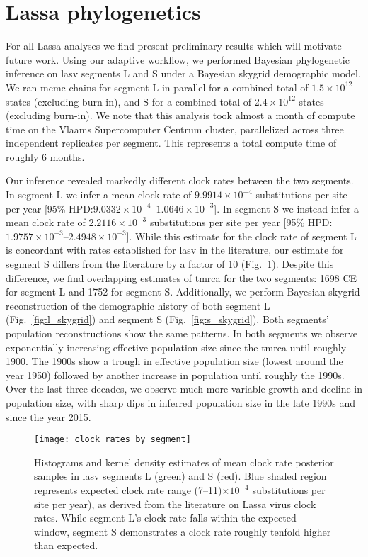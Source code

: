 \section{Lassa phylogenetics}

For all Lassa analyses we find present preliminary results which will motivate future work.
Using our adaptive workflow, we performed Bayesian phylogenetic inference on \gls{lasv} segments L and S under a Bayesian skygrid demographic model.
We ran \gls{mcmc} chains for segment L in parallel for a combined total of $1.5\times10^{12}$ states (excluding burn-in), and S for a combined total of $2.4\times10^{12}$ states (excluding burn-in).
We note that this analysis took almost a month of compute time on the Vlaams Supercomputer Centrum cluster, parallelized across three independent replicates per segment.
This represents a total compute time of roughly 6 months.

Our inference revealed markedly different clock rates between the two segments.
In segment L we infer a mean clock rate of $9.9914\times10^{-4}$ substitutions per site per year [95\% HPD:$9.0332\times10^{-4}$--$1.0646\times10^{-3}$].
In segment S we instead infer a mean clock rate of $2.2116\times10^{-3}$ substitutions per site per year [95\% HPD:$1.9757\times10^{-3}$--$2.4948\times10^{-3}$].
While this estimate for the clock rate of segment L is concordant with rates established for \gls{lasv} in the literature\cite{andersen2015clinical, fichet2016spatial}, our estimate for segment S differs from the literature by a factor of 10 (Fig.~\ref{fig:lassa_clock_rates}).
Despite this difference, we find overlapping estimates of \gls{tmrca} for the two segments: 1698 CE for segment L and 1752 for segment S.
Additionally, we perform Bayesian skygrid reconstruction of the demographic history of both segment L (Fig.~\ref{fig:l_skygrid}) and segment S (Fig.~\ref{fig:s_skygrid}).
Both segments' population reconstructions show the same patterns.
In both segments we observe exponentially increasing effective population size since the \gls{tmrca} until roughly 1900.
The 1900s show a trough in effective population size (lowest around the year 1950) followed by another increase in population until roughly the 1990s.
Over the last three decades, we observe much more variable growth and decline in population size, with sharp dips in inferred population size in the late 1990s and since the year 2015.

\begin{figure}[ht]
  \centering
  \medskip
  \texttt{[image: clock\_rates\_by\_segment]}
  \caption[LASV clock rates by segment]{Histograms and kernel density estimates of mean clock rate posterior samples in \gls{lasv} segments L (green) and S (red). Blue shaded region represents expected clock rate range (7--11)$\times10^{-4}$ substitutions per site per year), as derived from the literature on Lassa virus clock rates\cite{andersen2015clinical, fichet2016spatial}. While segment L's clock rate falls within the expected window, segment S demonstrates a clock rate roughly tenfold higher than expected.}
  \label{fig:lassa_clock_rates}
\end{figure}

